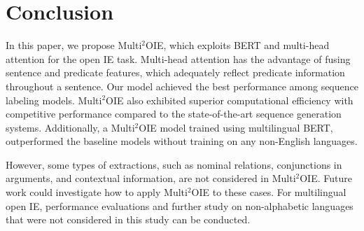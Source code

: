 \documentclass[11pt,a4paper]{article}
\begin{document}
\section{Conclusion}
In this paper, we propose Multi$^2$OIE, which exploits BERT and multi-head attention for the open IE task.
Multi-head attention has the advantage of fusing sentence and predicate features, which adequately reflect predicate information throughout a sentence.
Our model achieved the best performance among sequence labeling models.
Multi$^2$OIE also exhibited superior computational efficiency with competitive performance compared to the state-of-the-art sequence generation systems.
Additionally, a Multi$^2$OIE model trained using multilingual BERT, outperformed the baseline models without training on any non-English languages.

However, some types of extractions, such as nominal relations, conjunctions in arguments, and contextual information, are not considered in Multi$^2$OIE.
Future work could investigate how to apply Multi$^2$OIE to these cases.
For multilingual open IE, performance evaluations and further study on non-alphabetic languages that were not considered in this study can be conducted.



\end{document}
